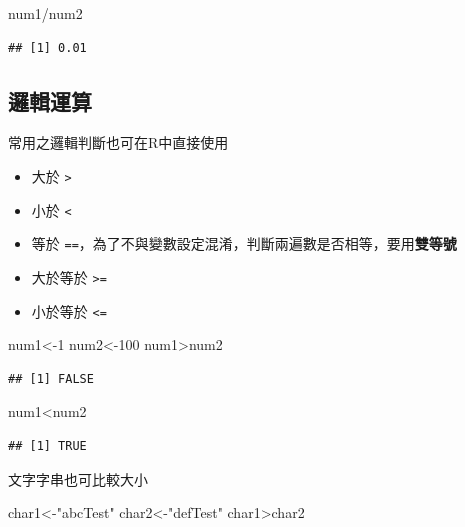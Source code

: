 \documentclass[]{book}
\newenvironment{Shaded}{\begin{snugshade}}{\end{snugshade}}
\newcommand{\DecValTok}[1]{\textcolor[rgb]{0.00,0.00,0.81}{{#1}}}
\newcommand{\StringTok}[1]{\textcolor[rgb]{0.31,0.60,0.02}{{#1}}}
\newcommand{\NormalTok}[1]{{#1}}
\providecommand{\tightlist}{%
  \setlength{\itemsep}{0pt}\setlength{\parskip}{0pt}}
\theoremstyle{definition}
\theoremstyle{definition}
\theoremstyle{remark}
\begin{document}
\begin{Shaded}
\begin{Highlighting}[]
\NormalTok{num1/num2}
\end{Highlighting}
\end{Shaded}

\begin{verbatim}
## [1] 0.01
\end{verbatim}

\subsection{邏輯運算}

常用之邏輯判斷也可在R中直接使用

\begin{itemize}
\tightlist
\item
  大於 \texttt{\textgreater{}}
\item
  小於 \texttt{\textless{}}
\item
  等於
  \texttt{==}，為了不與變數設定混淆，判斷兩遍數是否相等，要用\textbf{雙等號}
\item
  大於等於 \texttt{\textgreater{}=}
\item
  小於等於 \texttt{\textless{}=}
\end{itemize}

\begin{Shaded}
\begin{Highlighting}[]
\NormalTok{num1<-}\DecValTok{1}
\NormalTok{num2<-}\DecValTok{100}
\NormalTok{num1>num2}
\end{Highlighting}
\end{Shaded}

\begin{verbatim}
## [1] FALSE
\end{verbatim}

\begin{Shaded}
\begin{Highlighting}[]
\NormalTok{num1<num2}
\end{Highlighting}
\end{Shaded}

\begin{verbatim}
## [1] TRUE
\end{verbatim}

文字字串也可比較大小

\begin{Shaded}
\begin{Highlighting}[]
\NormalTok{char1<-}\StringTok{"abcTest"} 
\NormalTok{char2<-}\StringTok{"defTest"}
\NormalTok{char1>char2}
\end{Highlighting}
\end{Shaded}
\end{document}
